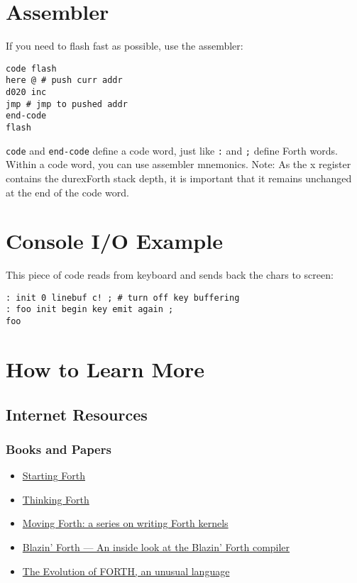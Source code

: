 \section{Assembler}

If you need to flash fast as possible, use the assembler:

\begin{verbatim}
code flash
here @ # push curr addr
d020 inc 
jmp # jmp to pushed addr
end-code
flash
\end{verbatim}

\texttt{code} and \texttt{end-code} define a code word, just like \texttt{:} and \texttt{;} define Forth words. Within a code word, you can use assembler mnemonics. 
Note: As the x register contains the durexForth stack depth, it is important that it remains unchanged at the end of the code word.

\section{Console I/O Example}

This piece of code reads from keyboard and sends back the chars to screen:

\begin{verbatim}
: init 0 linebuf c! ; # turn off key buffering
: foo init begin key emit again ;
foo
\end{verbatim}

\section{How to Learn More}

\subsection{Internet Resources}

\subsubsection{Books and Papers}

\begin{itemize}
\item \href{http://www.forth.com/starting-forth/}{Starting Forth}
\item \href{http://thinking-forth.sourceforge.net/}{Thinking Forth}
\item \href{http://www.bradrodriguez.com/papers/}{Moving Forth: a series on writing Forth kernels}
\item \href{http://www.csbruce.com/~csbruce/cbm/transactor/v7/i5/p058.html}{Blazin' Forth --- An inside look at the Blazin' Forth compiler}
\item \href{http://dobbscodetalk.com/index.php?option=com_myblog&show=In-this-1980-article-from-Byte-Charles-Moore-recounts-the-creation-of-Forth..html&Itemid=29}{The Evolution of FORTH, an unusual language}
\end{itemize}

